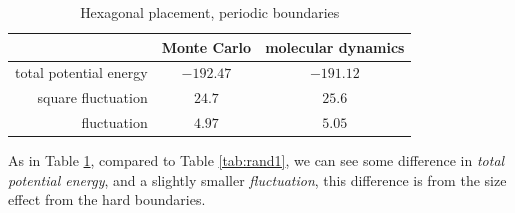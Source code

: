 \documentclass[UTF8,a4paper]{article}
\begin{document}
\begin{table}[H]
	\centering
	\caption{Hexagonal placement, periodic boundaries}
	\begin{tabular}{rcc}
		\toprule
		\toprule
		                       & Monte Carlo & molecular dynamics \\ \midrule
		total potential energy & $-192.47$   & $-191.12$          \\
		square fluctuation     & $24.7$      & $25.6$             \\
		fluctuation            & $4.97$      & $5.05$             \\
		\bottomrule
	\end{tabular}%
	\label{tab:rand_hard1}%
\end{table}%
As in Table \ref{tab:rand_hard1}, compared to Table \ref{tab:rand1}, we can see some difference in \textit{total potential energy}, and a slightly smaller \textit{fluctuation},
this difference is from the size effect from the hard boundaries.
\end{document}

